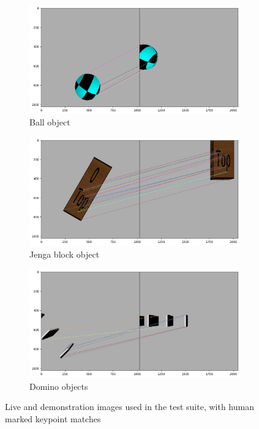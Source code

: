 \begin{figure}[h]
    \begin{subfigure}[b]{0.49\textwidth}
        \includegraphics[width=\textwidth]{figures/matchBall.png}
        \caption{Ball object}
    \end{subfigure}
    \hfill
    \begin{subfigure}[b]{0.49\textwidth}
        \includegraphics[width=\textwidth]{figures/matchJenga.png}
        \caption{Jenga block object}
    \end{subfigure}
    
    \begin{subfigure}[b]{0.49\textwidth}
        \includegraphics[width=\textwidth]{figures/matchDominoes.png}
        \caption{Domino objects}
    \end{subfigure}
    \caption{Live and demonstration images used in the test suite, with human marked keypoint matches}
    \label{fig:testImages}
\end{figure}


